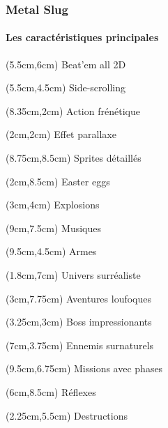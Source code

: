 \begin{frame}
	
	\frametitle{Metal Slug}
	\framesubtitle{Les caractéristiques principales}
	
	{
		\begin{textblock*}{5cm}(5.5cm,6cm)
			{\LARGE Beat'em all 2D}
		\end{textblock*}
		\begin{textblock*}{5cm}(5.5cm,4.5cm)
			{\LARGE Side-scrolling}
		\end{textblock*}
		\begin{textblock*}{5cm}(8.35cm,2cm)
			{\LARGE Action frénétique}
		\end{textblock*}
		\begin{textblock*}{5cm}(2cm,2cm)
			{\LARGE Effet parallaxe}
		\end{textblock*}
		\begin{textblock*}{5cm}(8.75cm,8.5cm)
			{\LARGE Sprites détaillés}
		\end{textblock*}
		\begin{textblock*}{5cm}(2cm,8.5cm)
			{\LARGE Easter eggs}
		\end{textblock*}
	
		\begin{textblock*}{5cm}(3cm,4cm)
			{\large Explosions}
		\end{textblock*}
		\begin{textblock*}{5cm}(9cm,7.5cm)
			{\large Musiques}
		\end{textblock*}
		\begin{textblock*}{5cm}(9.5cm,4.5cm)
			{\large Armes}
		\end{textblock*}
	
		\begin{textblock*}{5cm}(1.8cm,7cm)
			{\small Univers surréaliste}
		\end{textblock*}
		\begin{textblock*}{5cm}(3cm,7.75cm)
			{\small Aventures loufoques}
		\end{textblock*}
		\begin{textblock*}{5cm}(3.25cm,3cm)
			{\small Boss impressionants}
		\end{textblock*}
		\begin{textblock*}{5cm}(7cm,3.75cm)
			{\small Ennemis surnaturels}
		\end{textblock*}
	
		\begin{textblock*}{5cm}(9.5cm,6.75cm)
			{\scriptsize Missions avec phases}
		\end{textblock*}
		\begin{textblock*}{5cm}(6cm,8.5cm)
			{\scriptsize Réflexes}
		\end{textblock*}
		\begin{textblock*}{5cm}(2.25cm,5.5cm)
			{\scriptsize Destructions}
		\end{textblock*}
	}
	
\end{frame}
